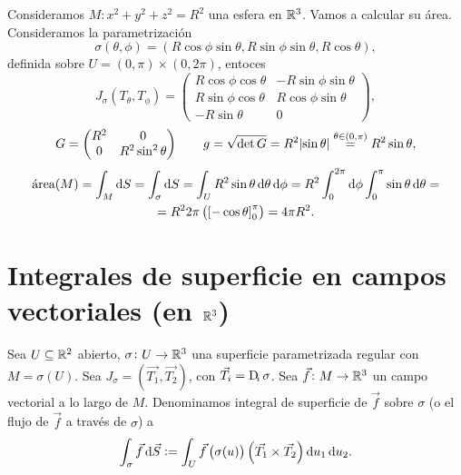 \begin{example*}
    Consideramos $M: x^2 + y^2 + z^2 = R^2$ una esfera en $\mathbb{R}^3$. Vamos a calcular su área. Consideramos la parametrización
    \[
        \sigma(\theta, \phi) = \left( R \cos \phi \sin \theta, R \sin\phi \sin \theta, R \cos \theta \right),
    \]
    definida sobre $U = (0,\pi) \times (0,2\pi)$, entoces
    \[
        J_\sigma\left( T_\theta, T_\phi \right) =
        \begin{pmatrix}
            R \cos \phi \cos \theta & - R \sin\phi\sin\theta \\
            R \sin \phi \cos \theta & R \cos\phi\sin\theta \\
            -R\sin\theta & 0
        \end{pmatrix},
    \]
    \[
        G =
        \begin{pmatrix}
            R^2 & 0 \\ 0 & R^2 \sin^2\theta
        \end{pmatrix}
        \qquad
        g = \sqrt{\det G} = R^2 \abs{\sin \theta} \stackrel{\theta \in (0,\pi)}{=} R^2 \sin \theta,
    \]
    \begin{gather*}
        \text{\'area}(M) = \int_M \dif S = \int_\sigma \dif S = \int_U R^2 \sin \theta \dif \theta \dif \phi = R^2 \int^{2\pi}_0 \dif\phi \int^\pi_0 \sin \theta \dif \theta = \\
        = R^2 2\pi \left( \left[ -\cos\theta \right]^\pi_0 \right) = 4\pi R^2.
    \end{gather*}
\end{example*}

\section{Integrales de superficie en campos vectoriales (en $\mathbb{R}^3$)}

\begin{defi}
    Sea $U \subseteq \mathbb{R}^2$ abierto, $\sigma \colon U \to \mathbb{R}^3$ una superficie parametrizada regular con
    $M = \sigma(U)$. Sea $J_\sigma = \left( \vec{T_1}, \vec{T_2} \right)$, con $\vec{T_i} = \Dif_i \sigma$.
    Sea $\vec{f} \colon M \to \mathbb{R}^3$ un campo vectorial a lo largo de $M$. Denominamos integral de superficie de $\vec{f}$
    sobre $\sigma$ (o el flujo de $\vec{f}$ a trav\'es de $\sigma$) a
    \[
        \int_\sigma \vec{f} \dif \vec{S} := \int_U \vec{f}\left( \sigma(u) \right) \left( \vec{T_1} \times \vec{T_2} \right) \dif u_1 \dif u_2.
    \]
\end{defi}

